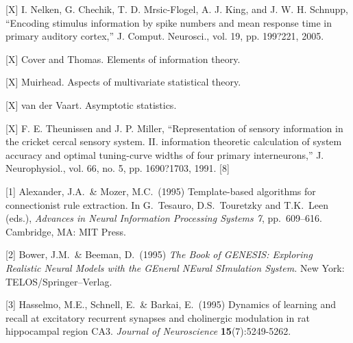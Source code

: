 \documentclass{article}
\begin{document}
[X] I. Nelken, G. Chechik, T. D. Mrsic-Flogel, A. J. King, and J. W. H.
Schnupp, ``Encoding stimulus information by spike numbers and mean
response time in primary auditory cortex,'' J. Comput. Neurosci., vol.
19, pp. 199?221, 2005.

[X] Cover and Thomas.  Elements of information theory.

[X]  Muirhead.  Aspects of multivariate statistical theory.

[X] van der Vaart.  Asymptotic statistics.

[X] F. E. Theunissen and J. P. Miller, ``Representation of sensory information in the cricket cercal sensory system. II. information theoretic calculation of system accuracy and optimal tuning-curve widths of four primary interneurons,'' J. Neurophysiol., vol. 66, no. 5, pp. 1690?1703, 1991.
[8]

[1] Alexander, J.A.\ \& Mozer, M.C.\ (1995) Template-based algorithms
for connectionist rule extraction. In G.\ Tesauro, D.S.\ Touretzky and
T.K.\ Leen (eds.), {\it Advances in Neural Information Processing
  Systems 7}, pp.\ 609--616. Cambridge, MA: MIT Press.

[2] Bower, J.M.\ \& Beeman, D.\ (1995) {\it The Book of GENESIS:
  Exploring Realistic Neural Models with the GEneral NEural SImulation
  System.}  New York: TELOS/Springer--Verlag.

[3] Hasselmo, M.E., Schnell, E.\ \& Barkai, E.\ (1995) Dynamics of
learning and recall at excitatory recurrent synapses and cholinergic
modulation in rat hippocampal region CA3. {\it Journal of
  Neuroscience} {\bf 15}(7):5249-5262.
\end{document}
